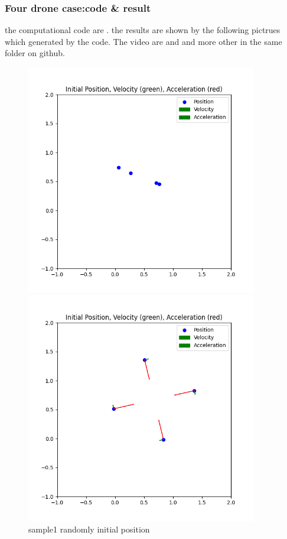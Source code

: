 \documentclass{article}
\theoremstyle{definition} %
\begin{document}
\subsubsection{Four drone case:code \& result}
the computational code are \cite[FourDroneCase]{FourDroneCase} .
the results are shown by the following pictrues which
generated by the code.
The video are \cite[sample1-video]{sample1-video}
and \cite[sample2-video]{sample2-video}
and more other in the same folder on github.
\begin{figure}[ht!]
    \centering
    \begin{minipage}{0.45\textwidth}
        \centering
        \includegraphics[width=0.9\textwidth]{fig/sample1/dd.png} %
        \caption{sample1 randomly initial position}
        \label{fig:fig1}
    \end{minipage}\hfill
    \begin{minipage}{0.45\textwidth}
        \centering
        \includegraphics[width=0.9\textwidth]{fig/sample1/dd_18254.png} %

\end{minipage}
\end{figure}
\end{document}
